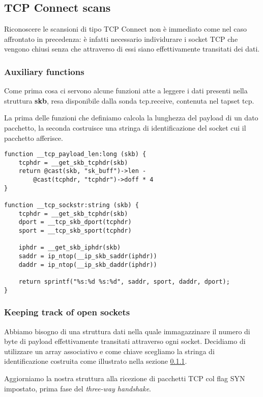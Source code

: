 \documentclass[11pt]{article}
\begin{document}
\subsection{TCP Connect scans}
Riconoscere le scansioni di tipo TCP Connect non è immediato come nel caso
affrontato in precedenza: è infatti necessario individurare i socket TCP che
vengono chiusi senza che attraverso di essi siano effettivamente transitati dei
dati.

\subsubsection{Auxiliary functions}
\label{tcpsockstr}
Come prima cosa ci servono alcune funzioni atte a leggere i dati presenti nella
struttura \textbf{skb}, resa disponibile dalla sonda tcp.receive, contenuta nel
tapset tcp.

La prima delle funzioni che definiamo calcola la lunghezza del payload di un
dato pacchetto, la seconda costruisce una stringa di identificazione del socket
cui il pacchetto afferisce.

\begin{lstlisting}
function __tcp_payload_len:long (skb) {
    tcphdr = __get_skb_tcphdr(skb)
    return @cast(skb, "sk_buff")->len - 
        @cast(tcphdr, "tcphdr")->doff * 4
}

function __tcp_sockstr:string (skb) {
    tcphdr = __get_skb_tcphdr(skb)
    dport = __tcp_skb_dport(tcphdr)
    sport = __tcp_skb_sport(tcphdr)

    iphdr = __get_skb_iphdr(skb)
    saddr = ip_ntop(__ip_skb_saddr(iphdr))
    daddr = ip_ntop(__ip_skb_daddr(iphdr))

    return sprintf("%s:%d %s:%d", saddr, sport, daddr, dport);
}
\end{lstlisting}

\subsubsection{Keeping track of open sockets}
Abbiamo bisogno di una struttura dati nella quale immagazzinare il numero di
byte di payload effettivamente transitati attraverso ogni socket. Decidiamo di
utilizzare un array associativo e come chiave scegliamo la stringa di
identificazione costruita come illustrato nella sezione \ref{tcpsockstr}.

Aggiorniamo la nostra struttura alla ricezione di pacchetti TCP col flag SYN
impostato, prima fase del \emph{three-way handshake}.
\end{document}
